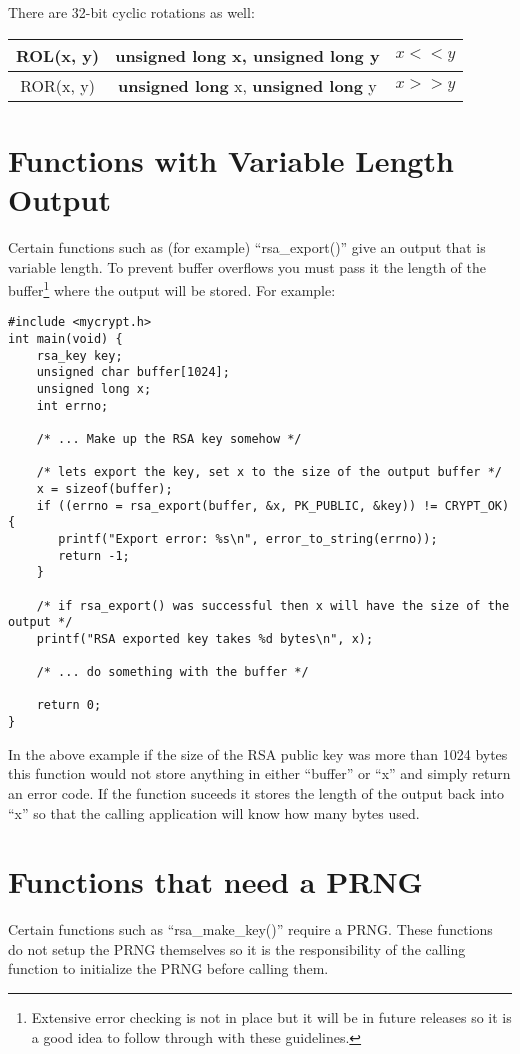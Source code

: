 \documentclass{book}
\begin{document}
There are 32-bit cyclic rotations as well:
 
\begin{center}
\begin{tabular}{|c|c|c|}
     \hline ROL(x, y) & {\bf unsigned long} x, {\bf unsigned long} y & $x << y$ \\
     \hline ROR(x, y) & {\bf unsigned long} x, {\bf unsigned long} y & $x >> y$ \\
     \hline
\end{tabular}
\end{center}

\section{Functions with Variable Length Output}
Certain functions such as (for example) ``rsa\_export()'' give an output that is variable length.  To prevent buffer overflows you
must pass it the length of the buffer\footnote{Extensive error checking is not in place but it will be in future releases so it is a good idea to follow through with these guidelines.} where
the output will be stored.  For example:
\begin{small}
\begin{verbatim}
#include <mycrypt.h>
int main(void) {
    rsa_key key;
    unsigned char buffer[1024];
    unsigned long x;
    int errno;

    /* ... Make up the RSA key somehow */

    /* lets export the key, set x to the size of the output buffer */
    x = sizeof(buffer);
    if ((errno = rsa_export(buffer, &x, PK_PUBLIC, &key)) != CRYPT_OK) {
       printf("Export error: %s\n", error_to_string(errno));
       return -1;
    }
    
    /* if rsa_export() was successful then x will have the size of the output */
    printf("RSA exported key takes %d bytes\n", x);

    /* ... do something with the buffer */

    return 0;
}
\end{verbatim}
\end{small}
In the above example if the size of the RSA public key was more than 1024 bytes this function would not store anything in
either ``buffer'' or ``x'' and simply return an error code.  If the function suceeds it stores the length of the output
back into ``x'' so that the calling application will know how many bytes used.

\section{Functions that need a PRNG}
Certain functions such as ``rsa\_make\_key()'' require a PRNG.  These functions do not setup the PRNG themselves so it is 
the responsibility of the calling function to initialize the PRNG before calling them.
\end{document}
